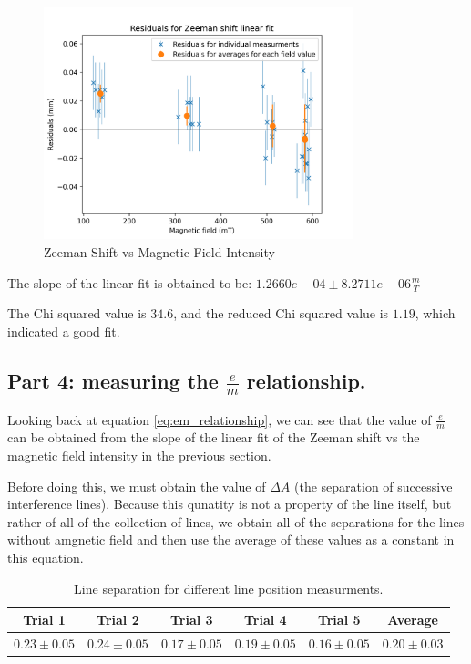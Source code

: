 \begin{figure}
    \centering
    \includegraphics[width=0.8\textwidth]{Results/img/zeeman_shift_residuals.png}
    \caption{Zeeman Shift vs Magnetic Field Intensity}
\end{figure}

The slope of the linear fit is obtained to be:
$1.2660e-04 \pm 8.2711e-06 \frac{m}{T}$

The Chi squared value is $34.6$, and the reduced Chi squared value is $1.19$, which indicated a good fit.

\subsection{Part 4: measuring the $\frac{e}{m}$ relationship.}

Looking back at equation \ref{eq:em_relationship}, we can see that the value of $\frac{e}{m}$ can be obtained from the slope of the linear fit of the Zeeman shift vs the magnetic field intensity in the previous section.

Before doing this, we must obtain the value of $\Delta A$ (the separation of successive interference lines). Because this qunatity is not a property
of the line itself, but rather of all of the collection of lines, we obtain all of the separations for the lines without amgnetic field
and then use the average of these values as a constant in this equation.

\def\lineUncertainty{0.05}
\begin{table}[h]
    \centering
    \begin{tabular}{|c|c|c|c|c|c|}
        \hline
        Trial 1                     & Trial 2                     & Trial 3                     & Trial 4                     & Trial 5                     & Average         \\
        \hline
        $0.23 \pm \lineUncertainty$ & $0.24 \pm \lineUncertainty$ & $0.17 \pm \lineUncertainty$ & $0.19 \pm \lineUncertainty$ & $0.16 \pm \lineUncertainty$ & $0.20 \pm 0.03$ \\
        \hline
    \end{tabular}
    \caption{Line separation for different line position measurments.}
    \label{your-label}
\end{table}



